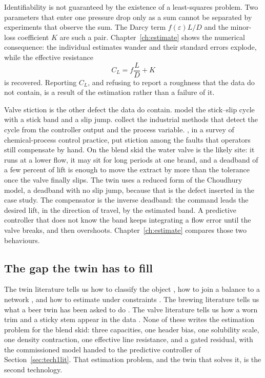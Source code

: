 Identifiability is not guaranteed by the existence of a least-squares problem. Two parameters that enter one pressure drop only as a sum cannot be separated by experiments that observe the sum. The Darcy term $f(\varepsilon)L/D$ and the minor-loss coefficient $K$ are such a pair. Chapter~\ref{ch:estimate} shows the numerical consequence: the individual estimates wander and their standard errors explode, while the effective resistance
\begin{equation}
\label{eq:closs}
C_L = f\frac{L}{D} + K
\end{equation}
is recovered. Reporting $C_L$, and refusing to report a roughness that the data do not contain, is a result of the estimation rather than a failure of it.

Valve stiction is the other defect the data do contain. \citet{choudhury2005} model the stick--slip cycle with a stick band and a slip jump. \citet{jelali2010} collect the industrial methods that detect the cycle from the controller output and the process variable. \citet{kano2010}, in a survey of chemical-process control practice, put stiction among the faults that operators still compensate by hand. On the blend skid the water valve is the likely site: it runs at a lower flow, it may sit for long periods at one brand, and a deadband of a few percent of lift is enough to move the extract by more than the tolerance once the valve finally slips. The twin uses a reduced form of the Choudhury model, a deadband with no slip jump, because that is the defect inserted in the case study. The compensator is the inverse deadband: the command leads the desired lift, in the direction of travel, by the estimated band. A predictive controller that does not know the band keeps integrating a flow error until the valve breaks, and then overshoots. Chapter~\ref{ch:estimate} compares those two behaviours.

\subsection{The gap the twin has to fill}

The twin literature tells us how to classify the object \citep{kritzinger2018}, how to join a balance to a network \citep{raissi2019,zheng2023,vonstosch2014}, and how to estimate under constraints \citep{rao2003}. The brewing literature tells us what a beer twin has been asked to do \citep{goffi2025}. The valve literature tells us how a worn trim and a sticky stem appear in the data \citep{choudhury2005,iec60534}. None of these writes the estimation problem for the blend skid: three capacities, one header bias, one solubility scale, one density contraction, one effective line resistance, and a gated residual, with the commissioned model handed to the predictive controller of Section~\ref{sec:tech1lit}. That estimation problem, and the twin that solves it, is the second technology.

